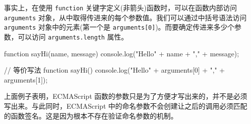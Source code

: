 事实上，在使用 \texttt{function} 关键字定义(非箭头)函数时，可以在函数内部访问 \texttt{arguments} 对象，从中取得传进来的每个参数值。我们可以通过中括号语法访问 \texttt{arguments} 对象中的元素(第一个是 \texttt{arguments[0]})。而要确定传进来多少个参数，可以访问 \texttt{arguments.length} 属性。

\begin{JavaScript}
function sayHi(name, message) {
    console.log("Hello" + name + "," + message);
    }
    
// 等价写法
function sayHi() {
    console.log("Hello" + arguments[0] + "," + arguments[1]);
}
\end{JavaScript}

上面例子表明，ECMAScript 函数的参数只是为了方便才写出来的，并不是必须写出来。与此同时，ECMAScript 中的命名参数不会创建让之后的调用必须匹配的函数签名。这是因为根本不存在验证命名参数的机制。

\newpage